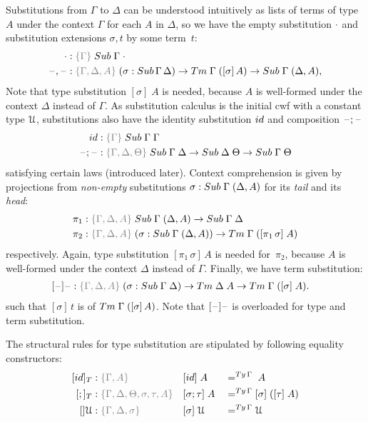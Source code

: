 \documentclass[a4paper,UKenglish,numberwithinsect,cleveref,thm-restate]{lipics-v2021}
\begin{document}
Substitutions from $\Gamma$ to $\Delta$ can be understood intuitively as lists of terms of type $A$ under the context $\Gamma$ for each $A$ in $\Delta$, so we have the empty substitution $\cdot$ and substitution extensions $\sigma, t$ by some term~$t$:
\begin{alignat*}{3}
  \emptysub & : \implicit{\Gamma}\;\Sub\;\Gamma\;\emptyctx \\
  \blank,\blank & : \implicit{\Gamma, \Delta, A}\;(\sigma : \Sub\,\Gamma\,\Delta) \to \Tm\;\Gamma\;([ \sigma ]\, A) \to \Sub\;\Gamma\;(\Delta, A),
\end{alignat*}
Note that type substitution $[\sigma]\;A$ is needed, because $A$ is well-formed under the context $\Delta$ instead of $\Gamma$.
As substitution calculus is the initial cwf with a constant type $\mathcal{U}$, substitutions also have the identity substitution $\idS$ and composition $\mathord{\hspace{1pt}\text{--}\hspace{1pt}};\mathord{\hspace{1pt}\text{--}\hspace{1pt}}$
\begin{alignat*}{3}
  \idS & : \implicit{\Gamma}\;\Sub\;\Gamma\;\Gamma \\
  \blank;\blank & : \implicit{\Gamma, \Delta, \Theta}\;\Sub\;\Gamma\;\Delta \to \Sub\;\Delta\;\Theta \to \Sub\;\Gamma\;\Theta
\end{alignat*}
satisfying certain laws (introduced later).
Context comprehension is given by projections from \emph{non-empty} substitutions $\sigma : \Sub\;\Gamma\;(\Delta, A)$
for its \emph{tail} and its \emph{head}:
\begin{alignat*}{3}
  \pi_1 & : \implicit{\Gamma, \Delta, A}\;\Sub\;\Gamma\;(\Delta, A) \to \Sub\;\Gamma\;\Delta \\
  \pi_2 & : \implicit{\Gamma, \Delta, A}\;(\sigma : \Sub\;\Gamma\;(\Delta, A)) \to \Tm\;\Gamma\;([ \pi_1\,\sigma ]\; A)
\end{alignat*}
respectively.
Again, type substitution $[\pi_1\,\sigma]\,A$ is needed for~$\pi_2$, because $A$ is well-formed under the context $\Delta$ instead of $\Gamma$.
Finally, we have term substitution:
\begin{alignat*}{3}
  [\blank] \blank & : \implicit{\Gamma,\Delta, A}\;(\sigma : \Sub\;\Gamma\;\Delta) \to \Tm\;\Delta\;A \to \Tm\;\Gamma\;([\sigma]\; A).
\end{alignat*}
such that $[\sigma]\,t$ is of $\Tm\;\Gamma\;([\sigma]\,A)$.
Note that $[\mathord{\hspace{1pt}\text{--}\hspace{1pt}}]\mathord{\hspace{1pt}\text{--}\hspace{1pt}}$ is overloaded for type and term substitution.

The structural rules for type substitution are stipulated by following equality constructors:
\begin{alignat*}{3}
  [\idS]_T & : \implicit{\Gamma, A}                               && [ \idS ] \;A         && =^{\Ty\,\Gamma}\;A \\
  [;]_T    & : \implicit{\Gamma, \Delta, \Theta, \sigma, \tau, A} && [ \sigma ; \tau ]\;A && =^{\Ty\,\Gamma} [ \sigma ]\;([ \tau ]\;A) \\
  []\UU      & : \implicit{\Gamma, \Delta, \sigma}                && [ \sigma ]\;\UU        && =^{\Ty\,\Gamma} \UU
\end{alignat*}
\end{document}
